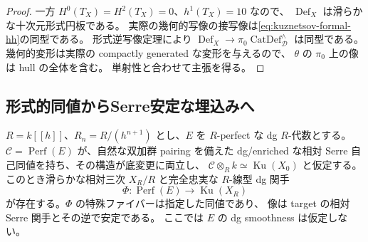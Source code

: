 \begin{proof}
一方 $H^0(T_X)=H^2(T_X)=0$、$h^1(T_X)=10$ なので、
$\operatorname{Def}_X$ は滑らかな十次元形式円板である。
実際の幾何的写像の接写像は\eqref{eq:kuznetsov-formal-hh}の同型である。
形式逆写像定理により
$\operatorname{Def}_X\to\pi_0\operatorname{CatDef}^{\wedge}_{\mathcal D}$ は同型である。
幾何的変形は実際の compactly generated な変形を与えるので、
$\theta$ の $\pi_0$ 上の像は hull の全体を含む。
単射性と合わせて主張を得る。
\end{proof}

\subsection{形式的同値からSerre安定な埋込みへ}

\begin{proposition}[係数perfectな効果化とSerre比較]
\label{prop:kuznetsov-effective-serre-embedding}
$R=k[[h]]$、$R_n=R/(h^{n+1})$ とし、$E$ を $R$-perfect な dg $R$-代数とする。
$\mathcal C=\operatorname{Perf}(E)$ が、自然な双加群 pairing を備えた
dg/enriched な相対 Serre 自己同値を持ち、その構造が底変更に両立し、
$\mathcal C\otimes_R k\simeq\operatorname{Ku}(X_0)$ と仮定する。
このとき滑らかな相対三次 $X_R/R$ と完全忠実な $R$-線型 dg 関手
\begin{equation}\label{eq:kuznetsov-effective-embedding}
 \Phi:\operatorname{Perf}(E)\longrightarrow\operatorname{Ku}(X_R)
\end{equation}
が存在する。$\Phi$ の特殊ファイバーは指定した同値であり、
像は target の相対 Serre 関手とその逆で安定である。
ここでは $E$ の dg smoothness は仮定しない。
\end{proposition}
